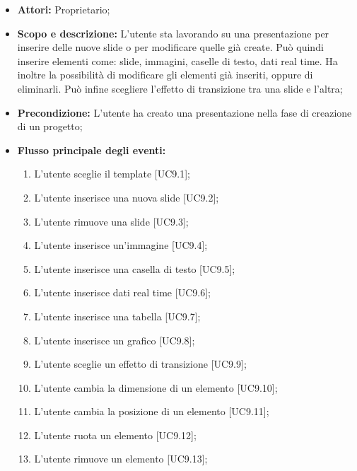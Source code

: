\begin{itemize}
	\item \textbf{Attori:} Proprietario;
	\item \textbf{Scopo e descrizione:} L'utente sta lavorando su una presentazione per inserire delle nuove \gls{slide} o per modificare quelle già create. Può quindi inserire  elementi come: \gls{slide}, immagini, caselle di testo, dati \gls{real time}. Ha inoltre la possibilità di modificare gli elementi già inseriti, oppure di eliminarli. Può infine scegliere l'effetto di transizione tra una \gls{slide} e l'altra;
	\item \textbf{Precondizione:} L'utente ha creato una presentazione nella fase di creazione di un progetto;
	\item \textbf{Flusso principale degli eventi:}
	\begin{enumerate}
		
		\item L'utente sceglie il \gls{template} [UC9.1];
		
		\item L'utente inserisce una nuova \gls{slide} [UC9.2];
		\item L'utente rimuove una \gls{slide} [UC9.3];
		
		\item L'utente inserisce un'immagine [UC9.4];
		
		\item L'utente inserisce una casella di testo [UC9.5];
		
		\item L'utente inserisce dati \gls{real time} [UC9.6];
		
		\item L'utente inserisce una tabella [UC9.7];
		
		\item L'utente inserisce un grafico [UC9.8];
		
		\item L'utente sceglie un effetto di transizione [UC9.9];
		
		\item L'utente cambia la dimensione di un elemento [UC9.10];
		
		\item L'utente cambia la posizione di un elemento [UC9.11];
		
		\item L'utente ruota un elemento [UC9.12];
		
		\item L'utente rimuove un elemento [UC9.13];
		

\end{enumerate}
\end{itemize}
